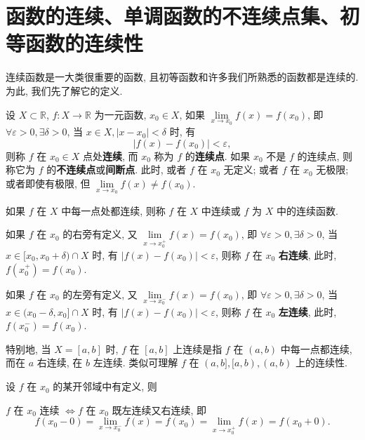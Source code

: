 \section{函数的连续、单调函数的不连续点集、初等函数的连续性}\label{sec:2.4}

连续函数是一大类很重要的函数, 且初等函数和许多我们所熟悉的函数都是连续的. 为此, 我们先了解它的定义.

\begin{definition}\label{def:2.4.1}
设 $X \subset \mathbb{R}$, $f: X \to \mathbb{R}$ 为一元函数, $x_0 \in X$, 如果 $\lim\limits_{x \to x_0} f(x) = f(x_0)$, 即 $\forall \varepsilon > 0, \exists \delta > 0$, 当 $x \in X, |x - x_0| < \delta$ 时, 有
\[
|f(x) - f(x_0)| < \varepsilon,
\]
则称 $f$ 在 $x_0 \in X$ 点处\textbf{连续}, 而 $x_0$ 称为 $f$ 的\textbf{连续点}. 如果 $x_0$ 不是 $f$ 的连续点, 则称它为 $f$ 的\textbf{不连续点}或\textbf{间断点}. 此时, 或者 $f$ 在 $x_0$ 无定义; 或者 $f$ 在 $x_0$ 无极限; 或者即使有极限, 但 $\lim\limits_{x \to x_0} f(x) \neq f(x_0)$.

如果 $f$ 在 $X$ 中每一点处都连续, 则称 $f$ 在 $X$ 中连续或 $f$ 为 $X$ 中的连续函数.

如果 $f$ 在 $x_0$ 的右旁有定义, 又 $\lim\limits_{x \to x_0^+} f(x) = f(x_0)$, 即 $\forall \varepsilon > 0, \exists \delta > 0$, 当 $x \in [x_0, x_0 + \delta) \cap X$ 时, 有 $|f(x) - f(x_0)| < \varepsilon$, 则称 $f$ 在 $x_0$ \textbf{右连续}, 此时, $f(x_0^+) = f(x_0)$.

如果 $f$ 在 $x_0$ 的左旁有定义, 又 $\lim\limits_{x \to x_0^-} f(x) = f(x_0)$, 即 $\forall \varepsilon > 0, \exists \delta > 0$, 当 $x \in (x_0 - \delta, x_0] \cap X$ 时, 有 $|f(x) - f(x_0)| < \varepsilon$, 则称 $f$ 在 $x_0$ \textbf{左连续}, 此时, $f(x_0^-) = f(x_0)$.

特别地, 当 $X = [a, b]$ 时, $f$ 在 $[a, b]$ 上连续是指 $f$ 在 $(a, b)$ 中每一点都连续, 而在 $a$ 右连续, 在 $b$ 左连续. 类似可理解 $f$ 在 $(a, b], [a, b), (a, b)$ 上的连续性.
\end{definition}

\begin{theorem}\label{thm:2.4.1}
设 $f$ 在 $x_0$ 的某开邻域中有定义, 则

$f$ 在 $x_0$ 连续 $\iff f$ 在 $x_0$ 既左连续又右连续, 即
\[
f(x_0 - 0) = \lim_{x \to x_0^-} f(x) = f(x_0) = \lim_{x \to x_0^+} f(x) = f(x_0 + 0).
\]
\end{theorem}


